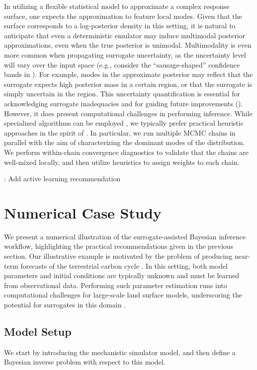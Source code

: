 \documentclass[12pt]{article}
\begin{document}
In utilizing a flexible statistical model to approximate a complex response surface, one expects
the approximation to feature local modes. Given that the surface corresponds to a
log-posterior density in this setting, it is natural to anticipate that even a deterministic emulator
may induce multimodal posterior approximations, even when the true posterior is unimodal. 
Multimodality is even more common when propagating surrogate uncertainty, as the uncertainty 
level will vary over the input space (e.g., consider the ``sausage-shaped'' confidence 
bands in ). For example, modes in the approximate posterior may reflect
that the surrogate expects high posterior mass in a certain region, or that the surrogate is simply 
uncertain in the region. This uncertainty quantification is essential for acknowledging surrogate 
inadequacies and for guiding future improvements (). However, it does
present computational challenges in performing inference. While specialized algorithms 
can be employed \citep{adaptiveMultimodal}, we typically prefer practical heuristic approaches
in the spirit of \citep{multimodalYao}. In particular, we run multiple MCMC chains in parallel with 
the aim of characterizing the dominant modes of the distribution. We perform within-chain 
convergence diagnostics to validate that the chains are well-mixed locally, and then 
utilize heuristics to assign weights to each chain.

\vspace

\todo: Add active learning recommendation

\section{Numerical Case Study} \label{sec:case-study}
We present a numerical illustration of the surrogate-assisted Bayesian inference workflow, highlighting
the practical recommendations given in the previous section.
Our illustrative example is motivated by the problem of producing near-term forecasts of the 
terrestrial carbon cycle \citep{nearTermForecasts,FerEmulation}. In this setting, both model parameters 
and initial conditions are typically unknown and must be learned from observational data. Performing 
such parameter estimation runs into computational challenges for large-scale land surface models, 
underscoring the potential for surrogates in this domain \citep{paramLSM}.  

\subsection{Model Setup}
We start by introducing the mechanistic simulator model, and then define a Bayesian inverse 
problem with respect to this model.
\end{document}
